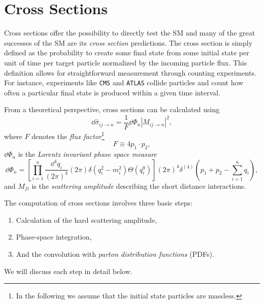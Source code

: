 \section{Cross Sections} \label{sec:2:cross_sections}
Cross sections offer the possibility to directly test the \acs{SM} and many of the great successes of the \acs{SM} are its \textit{cross section} predictions. The cross section is simply defined as the probability to create some final state from some initial state per unit of time per target particle normalized by the incoming particle flux. This definition allows for straightforward measurement through counting experiments. For instance, experiments like \texttt{CMS} and \texttt{ATLAS} collide particles and count how often a particular final state is produced within a given time interval.

From a theoretical perspective, cross sections can be calculated using
\begin{equation}
\dd \hat{\sigma}_{ij \rightarrow n} = \frac{1}{F} \dd \Phi_n |M_{ij\rightarrow n}|^2,
\label{eq:2:Xsec}
\end{equation}
where $F$ denotes the \textit{flux factor}\footnote{In the following we assume that the initial state particles are massless.}
\begin{equation}
F \equiv 4 p_1 \cdot p_2,
\end{equation}
$\dd \Phi_n$ is the \textit{Lorentz invariant phase space measure}
\begin{equation}
\dd \Phi_n = \left[\prod_{i = 1}^n \frac{\dd^4 q_i}{(2 \pi)^4 } (2 \pi) \delta(q_i^2 - m_i^2) \Theta(q_i^0) \right] (2 \pi)^4 \delta^{(4)} \! \left(p_1 + p_2 - \sum_{i = 1}^n q_i \right),
\end{equation}
and $M_{fi}$ is the \textit{scattering amplitude} describing the short distance interactions.

The computation of cross sections involves three basic steps:
\begin{enumerate}
  \item Calculation of the hard scattering amplitude,
  \item Phase-space integration,
  \item And the convolution with \textit{parton distribution functions} (\acs{PDF}s).
\end{enumerate}
We will discuss each step in detail below.

